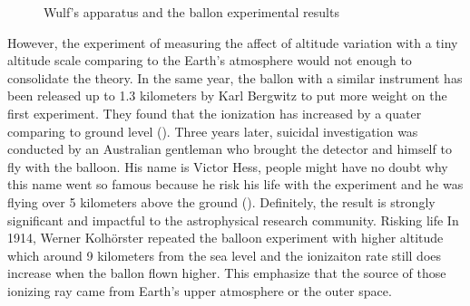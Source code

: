 \begin{figure}[h!]
    \centering
        \hfill
        \caption{Wulf's apparatus and the ballon experimental results}
       \label{fig:xxx}
\end{figure}


However, the experiment of measuring the affect of altitude
variation with a tiny altitude scale comparing to the Earth's
atmosphere would not enough to consolidate the theory.
In the same year, the ballon with a similar instrument has
been released up to 1.3 kilometers by Karl Bergwitz to put 
more weight on the first experiment. They found that the 
ionization has increased by a quater comparing to ground level 
(\cite{de2014atmospheric}).
Three years later, suicidal investigation was conducted by 
an Australian gentleman who brought the detector and himself
to fly with the balloon.
His name is Victor Hess, people might have no doubt why this
name went so famous because he risk his life with the experiment 
and he was flying over 5 kilometers above the ground (\cite{hess1912beobachtungen}).
Definitely, the result is strongly significant and impactful
to the astrophysical research community. Risking life  
In 1914, Werner Kolhörster repeated the balloon experiment 
with higher altitude which around 9 kilometers from the 
sea level and the ionizaiton rate still does increase when 
the ballon flown higher. This emphasize that the source of 
those ionizing ray came from Earth's upper atmosphere
or the outer space.

